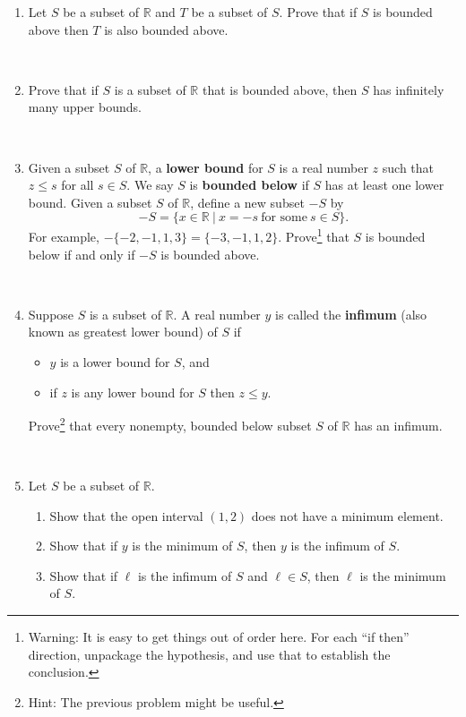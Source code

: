 \documentclass[12pt]{amsart}
\newcommand{\R}{\mathbb{R}}
\begin{document}
\begin{enumerate}
\item Let $S$ be a subset of $\R$ and $T$ be a subset of $S$. Prove that if $S$ is bounded above
then $T$ is also bounded above.

\

\item Prove that if $S$ is a subset of $\R$ that is bounded above, then $S$ has infinitely many upper bounds.

\

\item Given a subset $S$ of $\R$, a \textbf{lower bound} for $S$ is a real number $z$ such that $z \leq s$ for all $s \in S$.
We say $S$ is \textbf{bounded below} if $S$ has at least one lower bound.
Given a subset $S$ of $\R$, define a new subset $-S$ by
\[-S = \{x \in \R \ | \ x = -s \ \text{for some} \ s \in S\}.\]
For example, $- \{-2,-1, 1, 3\} = \{-3, -1, 1, 2\}.$
Prove\footnote{Warning: It is easy to get things out of order here. For each ``if then'' direction, unpackage the hypothesis, and use that to establish the conclusion.} that $S$ is bounded below if and only if $-S$ is bounded above.

\

\item Suppose $S$ is a subset of $\R$. A real number $y$ is called the \textbf{infimum} (also known as greatest
lower bound) of $S$ if
\begin{itemize}
\item $y$ is a lower bound for $S$, and
\item if $z$ is any lower bound for $S$ then $z \leq y$.
\end{itemize}
Prove\footnote{Hint: The previous problem might be useful.} that every nonempty, bounded below subset $S$ of $\R$ has an infimum.

\

\item Let $S$ be a subset of $\R$.
\begin{enumerate}
\item Show that the open interval $(1,2)$ does not have a minimum element.
\item Show that if $y$ is the minimum of $S$, then $y$ is the infimum of $S$.
\item Show that if $\ell$ is the infimum of $S$ and $\ell \in S$, then $\ell$ is the minimum of $S$.
\end{enumerate}
\end{enumerate}
\end{document}

